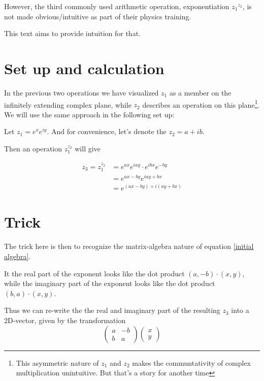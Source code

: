 \documentclass[a4paper, 12pt]{article}
\begin{document}
However, the third commonly used arithmetic operation, exponentiation ${z_1}^{z_2}$, is not made obvious/intuitive as part of their physics training.

This text aims to provide intuition for that.

\section{Set up and calculation}
In the previous two operations we have visualized $z_1$ as a member on the infinitely extending complex plane, while $z_2$ describes an operation on this plane\footnote{This asymmetric nature of $z_1$ and $z_2$ makes the communtativity of complex multiplication unintuitive. But that's a story for another time}. We will use the same approach in the following set up:

Let $z_1= e^{x} e^{iy}$. And for convenience, let's denote the $z_2 = a+ib$.

Then an operation $z_1^{z_2}$ will give 
    
\begin{align}
z_3 = z_1^{z_2}  & = e^{ax} e^{iay} \cdot e^{ibx} e^{-by}\\
                & = e^{ax - by} e^{iay + bx} \\
                & = e^{(ax-by) +i (ay+bx)} \label{initial algebra}
\end{align}

\section{Trick}
The trick here is then to recognize the matrix-algebra nature of equation \ref{initial algebra}.

It the real part of the exponent looks like the dot product $ (a, -b) \cdot (x, y)$, while
the imaginary part of the exponent looks like the dot product $(b, a) \cdot (x, y)$.

Thus we can re-write the the real and imaginary part of the resulting $z_3$ into a 2D-vector, given by the transformation
\begin{equation}
\begin{pmatrix}
a & -b\\
b & a
\end{pmatrix}
\begin{pmatrix}
x\\
y
\end{pmatrix}\label{transformation equation}
\end{equation}
\end{document}
